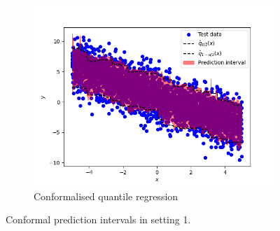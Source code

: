 \documentclass[11pt, titlepage]{article} %
\numberwithin{equation}{section}
\theoremstyle{definition}
\numberwithin{theorem}{section}
\numberwithin{lemma}{section}
\numberwithin{corollary}{section}
\numberwithin{proposition}{section}
\numberwithin{definition}{section}
\numberwithin{remark}{section}
\begin{document}
\begin{figure}[H]
\begin{subfigure}{0.49\textwidth}
    \includegraphics[width=\linewidth]{figures/2_4_homoscedastic_CQR.png}    
    \caption{Conformalised quantile regression} \label{fig:2_4_homoscedastic_CQR}
    \end{subfigure}
    \caption{Conformal prediction intervals in setting 1.}
\label{fig:2_4_homoscedastic}
\end{figure}
\end{document}
